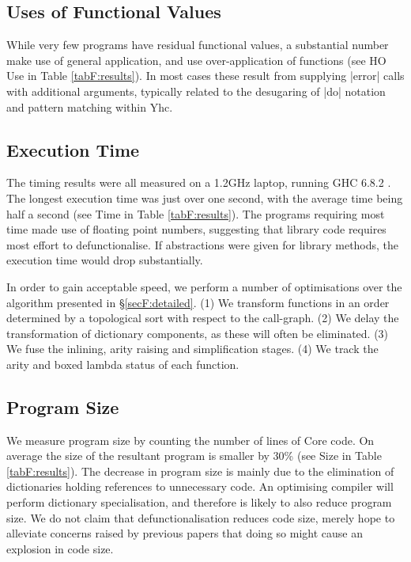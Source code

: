 \subsection{Uses of Functional Values}

While very few programs have residual functional values, a substantial number make use of general application, and use over-application of functions (see HO Use in Table \ref{tabF:results}). In most cases these result from supplying |error| calls with additional arguments, typically related to the desugaring of |do| notation and pattern matching within Yhc.

\subsection{Execution Time}
\label{secF:time}

The timing results were all measured on a 1.2GHz laptop, running GHC 6.8.2 \cite{ghc}. The longest execution time was just over one second, with the average time being half a second (see Time in Table \ref{tabF:results}). The programs requiring most time made use of floating point numbers, suggesting that library code requires most effort to defunctionalise. If abstractions were given for library methods, the execution time would drop substantially.

In order to gain acceptable speed, we perform a number of optimisations over the algorithm presented in \S\ref{secF:detailed}. (1) We transform functions in an order determined by a topological sort with respect to the call-graph. (2) We delay the transformation of dictionary components, as these will often be eliminated. (3) We fuse the inlining, arity raising and simplification stages. (4) We track the arity and boxed lambda status of each function.

\subsection{Program Size}

We measure program size by counting the number of lines of Core code. On average the size of the resultant program is smaller by 30\% (see Size in Table \ref{tabF:results}). The decrease in program size is mainly due to the elimination of dictionaries holding references to unnecessary code. An optimising compiler will perform dictionary specialisation, and therefore is likely to also reduce program size. We do not claim that defunctionalisation reduces code size, merely hope to alleviate concerns raised by previous papers \cite{chin:higher_order_removal} that doing so might cause an explosion in code size.



